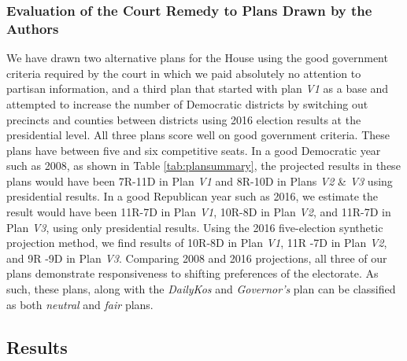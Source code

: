 \subsubsection*{Evaluation of the Court Remedy to Plans Drawn by the Authors}
%
We have drawn two alternative plans for the House using the good government criteria required by the court in which we paid absolutely no attention to partisan information, and a third plan that started with plan \textit{V1} as a base and attempted to increase the number of Democratic districts by switching out precincts and counties between districts using 2016 election results at the presidential level. All three plans score well on good government criteria. These plans have between five and six competitive seats. In a good Democratic year such as 2008, as shown in Table \ref{tab:plansummary}, the projected results in these plans would have been 7R-11D in Plan \textit{V1} and 8R-10D in Plans \textit{V2} \& \textit{V3} using presidential results. In a good Republican year such as 2016, we estimate the result would have been 11R-7D in Plan \textit{V1}, 10R-8D in Plan \textit{V2}, and 11R-7D in Plan \textit{V3}, using only presidential results. Using the 2016 five-election synthetic projection method, we find results of 10R-8D in Plan \textit{V1}, 11R -7D in Plan \textit{V2}, and 9R -9D in Plan \textit{V3}.  Comparing 2008 and 2016 projections, all three of our plans demonstrate responsiveness to shifting preferences of the electorate. As such, these plans, along with the \textit{DailyKos} and \textit{Governor's} plan can be classified as both \textit{neutral} and \textit{fair} plans.
%
%

\par
    \subsection*{Results}


